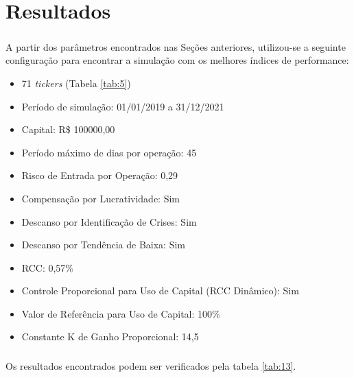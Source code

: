 \chapter{Resultados}
\label{cap4}



\paragraph{} A partir dos parâmetros encontrados nas Seções anteriores, utilizou-se a seguinte configuração para encontrar a simulação com os melhores índices de performance:

\begin{itemize}
    \item 71 \textit{tickers} (Tabela \ref{tab:5})
    \item Período de simulação: 01/01/2019 a 31/12/2021
    \item Capital: R\$ 100000,00
    \item Período máximo de dias por operação: 45
    \item Risco de Entrada por Operação: 0,29
    \item Compensação por Lucratividade: Sim
    \item Descanso por Identificação de Crises: Sim
    \item Descanso por Tendência de Baixa: Sim
    \item RCC: 0,57\%
    \item Controle Proporcional para Uso de Capital (RCC Dinâmico): Sim
    \item Valor de Referência para Uso de Capital: 100\%
    \item Constante K de Ganho Proporcional: 14,5
\end{itemize}

\paragraph{} Os resultados encontrados podem ser verificados pela tabela \ref{tab:13}.

